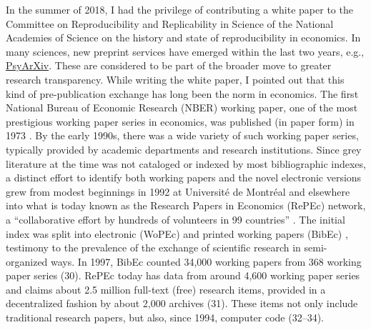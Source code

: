 
\begin{cornerbox}
In the summer of 2018, I had the privilege of contributing a white paper to the Committee on Reproducibility and Replicability in Science of the National Academies of Science on the history and state of reproducibility in economics. In many sciences, new preprint services have emerged within the last two years, e.g., \href{https://psyarxiv.com/}{PsyArXiv}. These are considered to be part of the broader move to greater research transparency. While writing the white paper, I pointed out that this kind of pre-publication exchange has long been the norm in economics. The first National Bureau of Economic Research (NBER) working paper, one of the most prestigious working paper series in economics, was published (in paper form) in 1973 \citep{WelchEducationInformationEfficiency1973}. By the early 1990s, there was a wide variety of such working paper series, typically provided by academic departments and research institutions. Since grey literature at the time was not cataloged or indexed by most bibliographic indexes, a distinct effort to identify both working papers and the novel electronic versions grew from modest beginnings in 1992 at Université de Montréal and elsewhere into what is today known as the Research Papers in Economics (RePEc) network, a “collaborative effort by hundreds of volunteers in 99 countries” \citep{RePEcResearchPapers,KrichelEconomicsOpenBibliographic2009,Batiz-Lazobriefbusinesshistory2012}. The initial index was split into electronic (WoPEc) \citep{KrichelWoPEcElectronicWorking1997}  and printed working papers (BibEc) \citep{KrichelEconomicsOpenBibliographic2009,CruzCatalogingEconomicsPreprints2000}, testimony to the prevalence of the exchange of scientific research in semi-organized ways.  In 1997, BibEc counted 34,000 working papers from 368 working paper series (30). RePEc today has data from around 4,600 working paper series and claims about 2.5 million full-text (free) research items, provided in a decentralized fashion by about 2,000 archives (31). These items not only include traditional research papers, but also, since 1994, computer code (32–34). 
\end{cornerbox}
